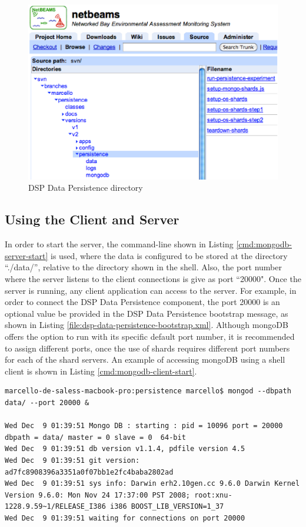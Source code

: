 \begin{figure}[!h]
  \centering
  \includegraphics[scale=0.5]{../diagrams/dsp-persistence-system-dir}
  \caption{DSP Data Persistence directory}
  \label{fig:dsp-persistence-system-dir}
\end{figure}

\subsection{Using the Client and Server}

In order to start the server, the command-line shown in Listing
\ref{cmd:mongodb-server-start} is used, where the data is configured to be
stored at the directory  ``./data/'', relative to the directory shown in the
shell. Also, the port number where the server listens to the client
connections is give as port ``20000". Once the server is running, any client
application can access to the server. For example, in order to connect the DSP
Data Persistence component, the port 20000 is an optional value be provided in
the DSP Data Persistence bootstrap message, as shown in Listing
\ref{file:dsp-data-persistence-bootstrap.xml}. Although mongoDB offers the
option to run with its specific default port number, it is recommended to
assign different ports, once the use of shards requires different port numbers
for each of the shard servers. An example of accessing mongoDB using a shell
client is shown in Listing \ref{cmd:mongodb-client-start}.

\lstset{label=cmd:mongodb-server-start,caption=Starting the Server}
\begin{lstlisting}
marcello-de-saless-macbook-pro:persistence marcello$ mongod --dbpath data/ --port 20000 &

Wed Dec  9 01:39:51 Mongo DB : starting : pid = 10096 port = 20000 dbpath = data/ master = 0 slave = 0  64-bit 
Wed Dec  9 01:39:51 db version v1.1.4, pdfile version 4.5
Wed Dec  9 01:39:51 git version: ad7fc8908396a3351a0f07bb1e2fc4baba2802ad
Wed Dec  9 01:39:51 sys info: Darwin erh2.10gen.cc 9.6.0 Darwin Kernel Version 9.6.0: Mon Nov 24 17:37:00 PST 2008; root:xnu-1228.9.59~1/RELEASE_I386 i386 BOOST_LIB_VERSION=1_37
Wed Dec  9 01:39:51 waiting for connections on port 20000
\end{lstlisting}


